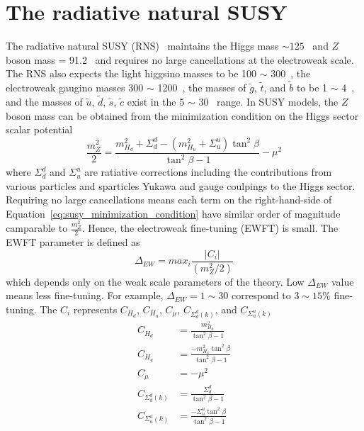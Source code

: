 
\section{The radiative natural SUSY}
\label{sec:susy_rns}
The radiative natural SUSY (RNS)~\cite{Baer:2013xua, Baer:2012up, Baer:2012se, Baer:2012cf} maintains the Higgs mass \mh $\sim 125$~{\GeV} and $Z$ boson mass \mZ = 91.2~{\GeV} and requires no large cancellations at the electroweak scale.
The RNS also expects the light higgsino masses to be 100 $\sim$ 300~{\GeV}, the electroweak gaugino masses 300 $\sim$ 1200~{\GeV}, the masses of $\tilde{g}$, $\tilde{t}$, and $\tilde{b}$ to be 1 $\sim$ 4~{\TeV}, and the masses of $\tilde{u}$, $\tilde{d}$, $\tilde{s}$, $\tilde{c}$ exist in the 5 $\sim$ 30~{\TeV} range.
In SUSY models, the $Z$ boson mass can be obtained from the minimization condition on the Higgs sector scalar potential
%
\begin{equation}
\frac{m_{Z}^{2}}{2} = \frac{m^{2}_{H_{d}} + \Sigma^{d}_{d} - (m^{2}_{H_{u}} + \Sigma^{u}_{u})\tan^{2}\beta      }{\tan^{2}\beta - 1} - \mu^{2}
\label{eq:susy_minimization_condition}
\end{equation}
%
where $\Sigma^{d}_{d}$ and $\Sigma^{u}_{u}$ are ratiative corrections including the contributions from various particles and sparticles Yukawa and gauge coulpings to the Higgs sector.
Requiring no large cancellations means each term on the right-hand-side of Equation~\ref{eq:susy_minimization_condition} have similar order of magnitude camparable to $\frac{m_{Z}^{2}}{2}$.
Hence, the electroweak fine-tuning (EWFT) is small.
The EWFT parameter is defined as
%
\begin{equation}
\Delta_{EW} =  max_{i} \frac{|C_{i}|}{(m_{Z}^{2}/2)} 
\label{eq:susy_ewft}
\end{equation}
%
which depends only on the weak scale parameters of the theory.
Low $\Delta_{EW}$ value means less fine-tuning.
For example, $\Delta_{EW} = 1 \sim 30$ correspond to $3 \sim 15 \%$ fine-tuning.
The $C_{i}$ represents $C_{H_{d}}$, $C_{H_{u}}$, $C_{\mu}$, $C_{\Sigma^{d}_{d}(k)}$, and $C_{\Sigma^{u}_{u}(k)}$
%
\begin{align}
C_{H_{d}} &= \frac{m^{2}_{H_{d}}}{\tan^{2}\beta - 1}\\
C_{H_{u}} &= \frac{-m^{2}_{H_{u}}\tan^{2}\beta}{\tan^{2}\beta - 1}\\
C_{\mu} &= -\mu^{2}\\
C_{\Sigma^{d}_{d}(k)} &= \frac{\Sigma^{d}_{d}}{\tan^{2}\beta - 1}\\
C_{\Sigma^{u}_{u}(k)} &= \frac{-\Sigma^{u}_{u}\tan^{2}\beta}{\tan^{2}\beta - 1}
\label{eq:susy_ci}
\end{align}
